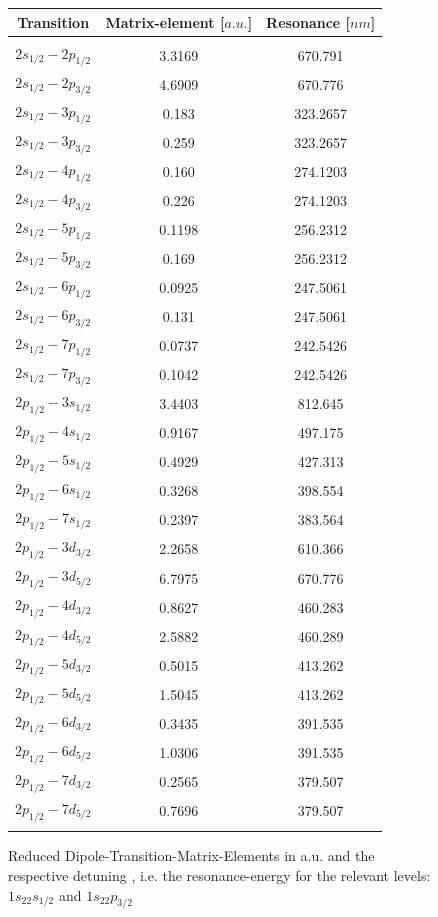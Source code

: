 \begin{figure}[H]
\begin{center}
\begin{tabular}{ccc}
Transition&Matrix-element [$\unit{a.u.}$]&Resonance [$\unit{nm}$]\\\hline\hline\\
$2s_{1/2}-2p_{1/2}$&3.3169&670.791\\
$2s_{1/2}-2p_{3/2}$&4.6909&670.776\\
$2s_{1/2}-3p_{1/2}$&0.183&323.2657\\
$2s_{1/2}-3p_{3/2}$&0.259&323.2657\\
$2s_{1/2}-4p_{1/2}$&0.160&274.1203\\
$2s_{1/2}-4p_{3/2}$&0.226&274.1203\\
$2s_{1/2}-5p_{1/2}$&0.1198&256.2312\\
$2s_{1/2}-5p_{3/2}$&0.169&256.2312\\
$2s_{1/2}-6p_{1/2}$&0.0925&247.5061\\
$2s_{1/2}-6p_{3/2}$&0.131&247.5061\\
$2s_{1/2}-7p_{1/2}$&0.0737&242.5426\\
$2s_{1/2}-7p_{3/2}$&0.1042&242.5426\\
$2p_{1/2}-3s_{1/2}$&3.4403&812.645\\
$2p_{1/2}-4s_{1/2}$&0.9167&497.175\\
$2p_{1/2}-5s_{1/2}$&0.4929&427.313\\
$2p_{1/2}-6s_{1/2}$&0.3268&398.554\\
$2p_{1/2}-7s_{1/2}$&0.2397&383.564\\
$2p_{1/2}-3d_{3/2}$&2.2658&610.366\\
$2p_{1/2}-3d_{5/2}$&6.7975&670.776\\
$2p_{1/2}-4d_{3/2}$&0.8627&460.283\\
$2p_{1/2}-4d_{5/2}$&2.5882&460.289\\
$2p_{1/2}-5d_{3/2}$&0.5015&413.262\\
$2p_{1/2}-5d_{5/2}$&1.5045&413.262\\
$2p_{1/2}-6d_{3/2}$&0.3435&391.535\\
$2p_{1/2}-6d_{5/2}$&1.0306&391.535\\
$2p_{1/2}-7d_{3/2}$&0.2565&379.507\\
$2p_{1/2}-7d_{5/2}$&0.7696&379.507\\\\\hline
\end{tabular}
\end{center}
\caption{Reduced Dipole-Transition-Matrix-Elements \cite{magic01} in a.u. and the respective detuning \cite{NIST_ASD}, i.e. the resonance-energy for the relevant levels: $1s_22s_{1/2}$ and $1s_22p_{3/2}$}
\label{matrixelements}
\end{figure}
